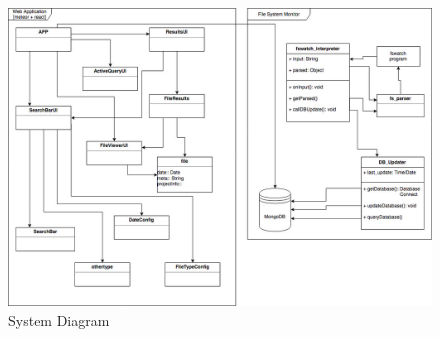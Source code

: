 \begin{figure}[h!]
  \begin{center}
    \caption{System Diagram}
    \includegraphics[width=\textwidth]{images/SystemOverview.png}
  \end{center}
\end{figure}
